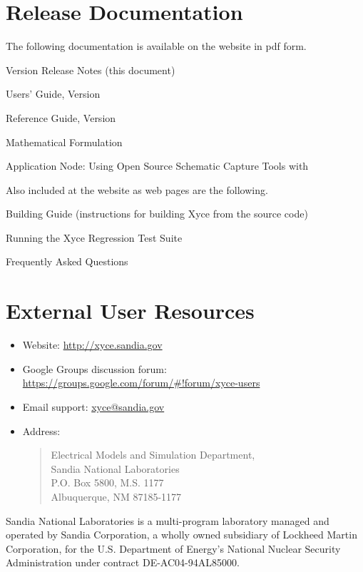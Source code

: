 \documentclass{article}
\begin{document}
\section{\Xyce{} Release \XyceVersionVar{} Documentation}
The following \Xyce{} documentation is available on the \Xyce{} website in pdf
form.
\begin{XyceItemize}
  \item \Xyce{} Version \XyceVersionVar{} Release Notes (this document)
  \item \Xyce{} Users' Guide, Version \XyceVersionVar{}
  \item \Xyce{} Reference Guide, Version \XyceVersionVar{}
  \item \Xyce{} Mathematical Formulation
  \item Application Node: Using Open Source Schematic Capture Tools with \Xyce{}
\end{XyceItemize}
Also included at the \Xyce{} website as web pages are the following.
\begin{XyceItemize}
  \item Building Guide (instructions for building Xyce from the source code)
  \item Running the Xyce Regression Test Suite
  \item Frequently Asked Questions
\end{XyceItemize}


\section{External User Resources}
\begin{itemize}
  \item Website: {\color{XyceDeepRed}\url{http://xyce.sandia.gov}}
  \item Google Groups discussion forum:
    {\color{XyceDeepRed}\url{https://groups.google.com/forum/#!forum/xyce-users}}
  \item Email support:
    {\color{XyceDeepRed}\href{mailto:xyce@sandia.gov}{xyce@sandia.gov}}
  \item Address:
    \begin{quote}
            Electrical Models and Simulation Department,\\
            Sandia National Laboratories\\
            P.O. Box 5800, M.S. 1177\\
            Albuquerque, NM 87185-1177 \\
    \end{quote}
\end{itemize}

\vspace*{\fill}
Sandia National Laboratories is a multi-program laboratory managed and
operated by Sandia Corporation, a wholly owned subsidiary of Lockheed Martin
Corporation, for the U.S. Department of Energy's National Nuclear Security
Administration under contract DE-AC04-94AL85000.
\end{document}
